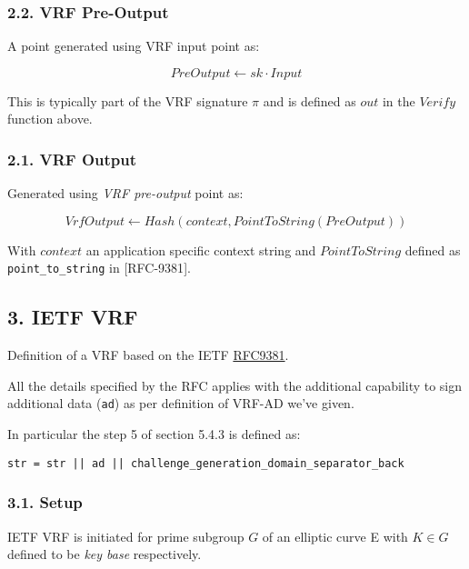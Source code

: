 \documentclass[
]{article}
\begin{document}
\hypertarget{vrf-pre-output}{%
\subsubsection{2.2. VRF Pre-Output}\label{vrf-pre-output}}

A point generated using VRF input point as:

\[PreOutput \leftarrow sk \cdot Input\]

This is typically part of the VRF signature \(\pi\) and is defined as
\(out\) in the \(Verify\) function above.

\hypertarget{vrf-output}{%
\subsubsection{2.1. VRF Output}\label{vrf-output}}

Generated using \emph{VRF pre-output} point as:

\[VrfOutput \leftarrow Hash(context, PointToString(PreOutput))\]

With \(context\) an application specific context string and
\(PointToString\) defined as \texttt{point\_to\_string} in
{[}RFC-9381{]}.

\hypertarget{ietf-vrf}{%
\subsection{3. IETF VRF}\label{ietf-vrf}}

Definition of a VRF based on the IETF
\href{https://datatracker.ietf.org/doc/rfc9381/}{RFC9381}.

All the details specified by the RFC applies with the additional
capability to sign additional data (\texttt{ad}) as per definition of
VRF-AD we've given.

In particular the step 5 of section 5.4.3 is defined as:

\begin{verbatim}
str = str || ad || challenge_generation_domain_separator_back
\end{verbatim}

\hypertarget{setup}{%
\subsubsection{3.1. Setup}\label{setup}}

IETF VRF is initiated for prime subgroup \(G\) of an elliptic curve E
with \(K \in G\) defined to be \emph{key base} respectively.
\end{document}
